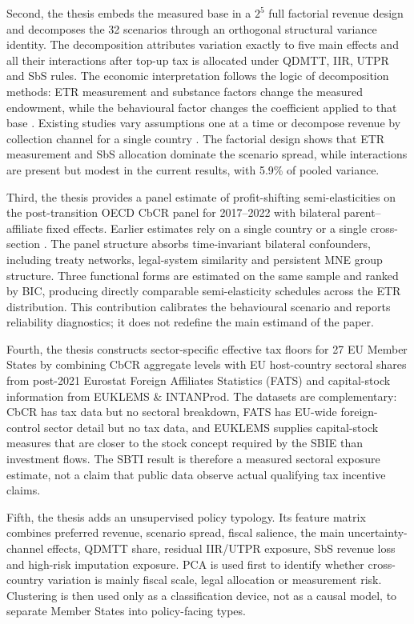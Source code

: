 \documentclass[11pt,a4paper]{article}
\begin{document}
Second, the thesis embeds the measured base in a $2^5$ full factorial revenue design and decomposes the 32 scenarios through an orthogonal structural variance identity. The decomposition attributes variation exactly to five main effects and all their interactions after top-up tax is allocated under QDMTT, IIR, UTPR and SbS rules. The economic interpretation follows the logic of decomposition methods: ETR measurement and substance factors change the measured endowment, while the behavioural factor changes the coefficient applied to that base \citep{oaxaca1973,blinder1973,shorrocks2013}. Existing studies vary assumptions one at a time \citep{barake2022,hugger2026} or decompose revenue by collection channel for a single country \citep{boukal2026}. The factorial design shows that ETR measurement and SbS allocation dominate the scenario spread, while interactions are present but modest in the current results, with 5.9\% of pooled variance.

Third, the thesis provides a panel estimate of profit-shifting semi-elasticities on the post-transition OECD CbCR panel for 2017--2022 with bilateral parent--affiliate fixed effects. Earlier estimates rely on a single country \citep{dowd2017,boukal2026} or a single cross-section \citep{garcia-bernardo2024}. The panel structure absorbs time-invariant bilateral confounders, including treaty networks, legal-system similarity and persistent MNE group structure. Three functional forms are estimated on the same sample and ranked by BIC, producing directly comparable semi-elasticity schedules across the ETR distribution. This contribution calibrates the behavioural scenario and reports reliability diagnostics; it does not redefine the main estimand of the paper.

Fourth, the thesis constructs sector-specific effective tax floors for 27 EU Member States by combining CbCR aggregate levels with EU host-country sectoral shares from post-2021 Eurostat Foreign Affiliates Statistics (FATS) and capital-stock information from EUKLEMS \& INTANProd. The datasets are complementary: CbCR has tax data but no sectoral breakdown, FATS has EU-wide foreign-control sector detail but no tax data, and EUKLEMS supplies capital-stock measures that are closer to the stock concept required by the SBIE than investment flows. The SBTI result is therefore a measured sectoral exposure estimate, not a claim that public data observe actual qualifying tax incentive claims.

Fifth, the thesis adds an unsupervised policy typology. Its feature matrix combines preferred revenue, scenario spread, fiscal salience, the main uncertainty-channel effects, QDMTT share, residual IIR/UTPR exposure, SbS revenue loss and high-risk imputation exposure. PCA is used first to identify whether cross-country variation is mainly fiscal scale, legal allocation or measurement risk. Clustering is then used only as a classification device, not as a causal model, to separate Member States into policy-facing types.
\end{document}
